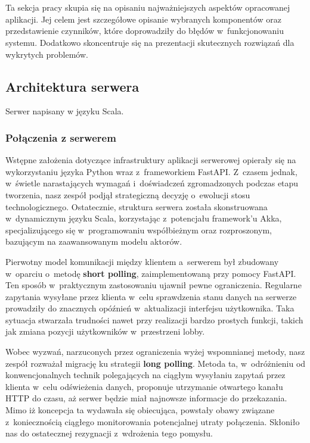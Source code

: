 \chapter{\ChapterTitleRealizationAspects}
\label{sec:wybrane-aspekty-realizacji}

Ta sekcja pracy skupia się na opisaniu najważniejszych aspektów
opracowanej aplikacji.
Jej celem jest szczegółowe opisanie wybranych
komponentów oraz przedstawienie czynników, które doprowadziły do
błędów w~funkcjonowaniu systemu. Dodatkowo skoncentruje
się na prezentacji skutecznych rozwiązań dla wykrytych problemów.

\section{Architektura serwera}
Serwer napisany w języku Scala.






\subsection{Połączenia z serwerem}
Wstępne założenia dotyczące infrastruktury aplikacji
serwerowej opierały się na wykorzystaniu języka Python
wraz z~frameworkiem FastAPI. Z~czasem jednak, w~świetle
narastających wymagań i~doświadczeń zgromadzonych
podczas etapu tworzenia, nasz zespół podjął
strategiczną decyzję o~ewolucji stosu technologicznego.
Ostatecznie, struktura serwera została skonstruowana
w~dynamicznym języku Scala, korzystając z~potencjału
framework'u Akka, specjalizującego się w~programowaniu
współbieżnym oraz rozproszonym, bazującym na
zaawansowanym modelu aktorów.

Pierwotny model komunikacji między klientem a~serwerem
był zbudowany w~oparciu o~metodę \textbf{short polling},
zaimplementowaną przy pomocy FastAPI. Ten sposób
w~praktycznym zastosowaniu ujawnił pewne ograniczenia.
Regularne zapytania wysyłane przez klienta w~celu
sprawdzenia stanu danych na serwerze prowadziły do
znacznych opóźnień w~aktualizacji interfejsu
użytkownika. Taka sytuacja stwarzała trudności nawet
przy realizacji bardzo prostych funkcji, takich jak
zmiana pozycji użytkowników w~przestrzeni lobby.

Wobec wyzwań, narzuconych przez ograniczenia wyżej wspomnianej metody, nasz
zespół rozważał migrację ku strategii \textbf{long polling}. Metoda ta,
w~odróżnieniu od konwencjonalnych technik polegających na ciągłym
wysyłaniu zapytań przez klienta w~celu odświeżenia danych, proponuje
utrzymanie otwartego kanału HTTP do czasu, aż serwer będzie miał
najnowsze informacje do przekazania. Mimo iż koncepcja ta wydawała się
obiecująca, powstały obawy związane z~koniecznością ciągłego monitorowania
potencjalnej utraty połączenia. Skłoniło nas do ostatecznej rezygnacji
z~wdrożenia tego pomysłu.

